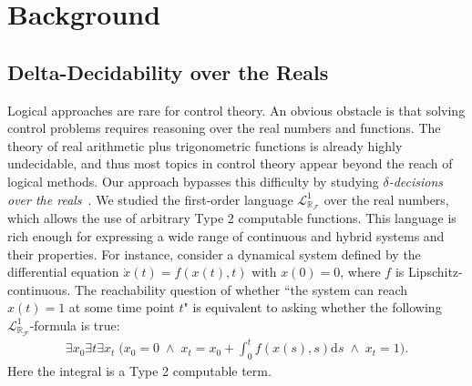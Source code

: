 \documentclass[10pt]{article}
\newcommand{\lrf}{\mathcal{L}_{\mathbb{R}_{\mathcal{F}}}}
\theoremstyle{definition}
\begin{document}
\newpage

\section{Background}

\subsection{Delta-Decidability over the Reals} 

Logical approaches are rare for control theory. An obvious obstacle is that solving control problems requires reasoning over the real numbers and functions. The theory of real arithmetic plus trigonometric functions is already highly undecidable, and thus most topics in control theory appear beyond the reach of logical methods. Our approach bypasses this difficulty by studying {\em $\delta$-decisions over the reals}~\cite{DBLP:conf/lics/GaoAC12}. We studied the first-order language $\lrf^1$ over the real numbers, which allows the use of arbitrary Type 2 computable functions. This language is rich enough for expressing a wide range of continuous and hybrid systems and their properties. For instance, consider a dynamical system defined by the differential equation $\dot{x}(t) = f(x(t),t)$ with $x(0)= 0$, where $f$ is Lipschitz-continuous. The reachability question of whether ``the system can reach $x(t)=1$ at some time point $t$" is equivalent to asking whether the following $\mathcal{L}^1_{\mathbb{R}_{\mathcal{F}}}$-formula is true:
\begin{eqnarray*}\exists x_0 \exists t \exists x_t\; \bigg(x_0 = 0 \;\wedge\; x_t = x_0 + \int_{0}^t f(x(s),s)\mathrm{d}s\; \wedge\; x_t = 1\bigg).\end{eqnarray*}
Here the integral is a Type 2 computable term. 
\end{document}

